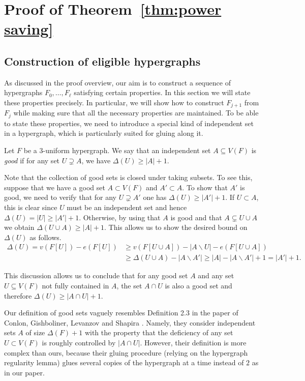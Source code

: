 \section{Proof of Theorem~\ref{thm:power saving}}

\subsection{Construction of eligible hypergraphs}\label{subsec:construction of eligible hypergraphs}

As discussed in the proof overview, our aim is to construct a sequence of hypergraphs $F_0, \dots, F_\ell$ satisfying certain properties. In this section we will state these properties precisely. In particular, we will show how to construct $F_{j+1}$ from $F_j$ while making sure that all the necessary properties are maintained. To be able to state these properties, we need to introduce a special kind of independent set in a hypergraph, which is particularly suited for gluing along it.

\begin{definition}\label{defn:good}
Let $F$ be a 3-uniform hypergraph. We say that an independent set $A\subseteq V(F)$ is \textit{good} if for any set $U\supsetneq A$, we have $\Delta(U)\geq |A|+1$.
\end{definition}

\noindent
Note that the collection of good sets is closed under taking subsets. To see this, suppose that we have a good set $A\subset V(F)$ and $A'\subset A$. To show that $A'$ is good, we need to verify that for any $U\supsetneq A'$ one has $\Delta(U)\geq |A'|+1$. If $U\subset A$, this is clear since $U$ must be an independent set and hence $\Delta(U)=|U|\geq |A'|+1$. Otherwise, by using that $A$ is good and that $A\subsetneq U\cup A$ we obtain $\Delta(U\cup A)\geq |A|+1$. This allows us to show the desired bound on $\Delta(U)$ as follows.
\begin{align*}
    \Delta(U)=v(F[U])-e(F[U])&\geq v(F[U\cup A])-|A\backslash U|-e(F[U\cup A])\\
    &\geq \Delta(U\cup A)-|A\backslash A'|\geq |A|-|A\backslash A'|+1=|A'|+1.
\end{align*}

This discussion allows us to conclude that for any good set $A$ and any set $U\subseteq V(F)$ not fully contained in $A$, the set $A\cap U$ is also a good set and therefore $\Delta(U)\geq |A\cap U|+1$. 

Our definition of good sets vaguely resembles Definition 2.3 in the paper of Conlon, Gishboliner, Levanzov and Shapira \cite{CGLS23}. Namely, they consider independent sets $A$ of size $\Delta(F)+1$ with the property that the deficiency of any set $U\subset V(F)$ is roughly controlled by $|A\cap U|$. However, their definition is more complex than ours, because their gluing procedure (relying on the hypergraph regularity lemma) glues several copies of the hypergraph at a time instead of $2$ as in our paper.

